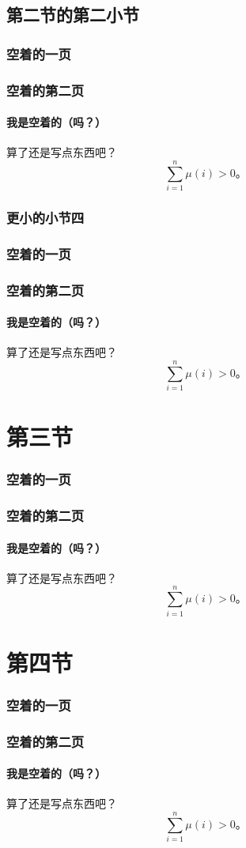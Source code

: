 \documentclass{../pkslide}
\begin{document}
\subsection{第二节的第二小节}

\begin{frame}
  \frametitle{空着的一页}
\end{frame}

\begin{frame}
  \frametitle{空着的第二页}
  \framesubtitle{我是空着的（吗？）}
  算了还是写点东西吧？
  \[ \sum_{i = 1}^{n} \mu(i) > 0 \text{。} \]
\end{frame}

\subsubsection{更小的小节四}

\begin{frame}
  \frametitle{空着的一页}
\end{frame}

\begin{frame}
  \frametitle{空着的第二页}
  \framesubtitle{我是空着的（吗？）}
  算了还是写点东西吧？
  \[ \sum_{i = 1}^{n} \mu(i) > 0 \text{。} \]
\end{frame}

\section{第三节}

\begin{frame}
  \frametitle{空着的一页}
\end{frame}

\begin{frame}
  \frametitle{空着的第二页}
  \framesubtitle{我是空着的（吗？）}
  算了还是写点东西吧？
  \[ \sum_{i = 1}^{n} \mu(i) > 0 \text{。} \]
\end{frame}

\section{第四节}

\begin{frame}
  \frametitle{空着的一页}
\end{frame}

\begin{frame}
  \frametitle{空着的第二页}
  \framesubtitle{我是空着的（吗？）}
  算了还是写点东西吧？
  \[ \sum_{i = 1}^{n} \mu(i) > 0 \text{。} \]
\end{frame}
\end{document}
